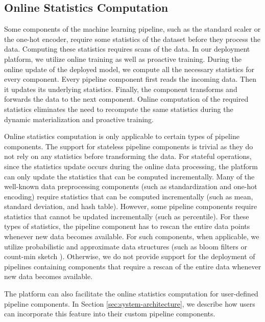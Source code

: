 \subsection{Online Statistics Computation}\label{online-statistics-computation}
Some components of the machine learning pipeline, such as the standard scaler or the one-hot encoder, require some statistics of the dataset before they process the data.
Computing these statistics requires scans of the data.
In our deployment platform, we utilize online training as well as proactive training.
During the online update of the deployed model, we compute all the necessary statistics for every component.
Every pipeline component first reads the incoming data.
Then it updates its underlying statistics.
Finally, the component transforms and forwards the data to the next component.
Online computation of the required statistics eliminates the need to recompute the same statistics during the dynamic materialization and proactive training.

Online statistics computation is only applicable to certain types of pipeline components.
The support for stateless pipeline components is trivial as they do not rely on any statistics before transforming the data.
For stateful operations, since the statistics update occurs during the online data processing, the platform can only update the statistics that can be computed incrementally.
Many of the well-known data preprocessing components (such as standardization and one-hot encoding) require statistics that can be computed incrementally (such as mean, standard deviation, and hash table).
However, some pipeline components require statistics that cannot be updated incrementally (such as percentile).
For these types of statistics, the pipeline component has to rescan the entire data points whenever new data becomes available.
For such components, when applicable, we utilize probabilistic and approximate data structures (such as bloom filters or count-min sketch \cite{cormode2005improved}).
Otherwise, we do not provide support for the deployment of pipelines containing components that require a rescan of the entire data whenever new data becomes available.

The platform can also facilitate the online statistics computation for user-defined pipeline components.
In Section \ref{sec:system-architecture}, we describe how users can incorporate this feature into their custom pipeline components.

